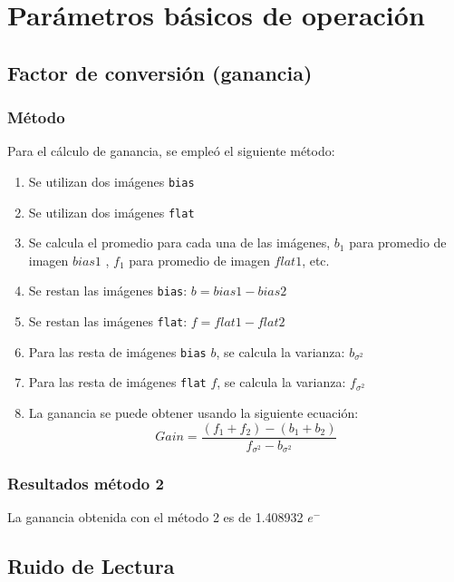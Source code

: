 \documentclass[a4paper,10pt]{article}
\begin{document}
\section{Parámetros básicos de operación}
\subsection{Factor de conversión (ganancia)}
\label{gain}
\subsubsection{Método}
Para el cálculo de ganancia, se empleó el siguiente método:
\begin{enumerate}
\item Se utilizan dos imágenes {\tt bias} 
\item Se utilizan dos imágenes {\tt flat} 
\item Se calcula el promedio para cada una de las imágenes, $b_1$ para promedio de imagen $bias 1$ , $f_1$ para promedio de imagen $flat 1$, etc.
\item Se restan las imágenes {\tt bias}: $b = bias1 - bias2$
\item Se restan las imágenes {\tt flat}: $f = flat1 - flat2$
\item Para las resta de imágenes {\tt bias} $b$, se calcula la varianza: $b_{\sigma^2}$
\item Para las resta de imágenes {\tt flat} $f$, se calcula la varianza: $f_{\sigma^2}$
\item La ganancia se puede obtener usando la siguiente ecuación: $$ Gain = \frac{ (f_1 + f_2) - (b_1 +b_2)}{f_{\sigma^2} - b_{\sigma^2}} $$
\end{enumerate}
\subsubsection{Resultados método 2}
La ganancia obtenida con el método 2 es de 1.408932 $e^-$
\subsection{Ruido de Lectura}
\end{document}
